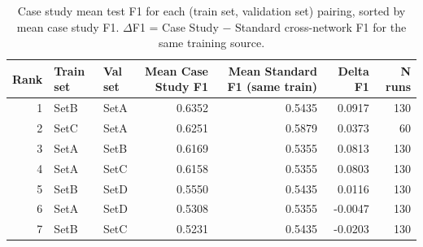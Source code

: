 \begin{table}
\caption{Case study mean test F1 for each (train set, validation set) pairing, sorted by mean case study F1. $\Delta$F1 = Case Study $-$ Standard cross-network F1 for the same training source.}
\label{tab:q6_pairings}
\begin{tabular}{rllrrrr}
\toprule
Rank & Train set & Val set & Mean Case Study F1 & Mean Standard F1 (same train) & Delta F1 & N runs \\
\midrule
1 & SetB & SetA & 0.6352 & 0.5435 & 0.0917 & 130 \\
2 & SetC & SetA & 0.6251 & 0.5879 & 0.0373 & 60 \\
3 & SetA & SetB & 0.6169 & 0.5355 & 0.0813 & 130 \\
4 & SetA & SetC & 0.6158 & 0.5355 & 0.0803 & 130 \\
5 & SetB & SetD & 0.5550 & 0.5435 & 0.0116 & 130 \\
6 & SetA & SetD & 0.5308 & 0.5355 & -0.0047 & 130 \\
7 & SetB & SetC & 0.5231 & 0.5435 & -0.0203 & 130 \\
\bottomrule
\end{tabular}
\end{table}
